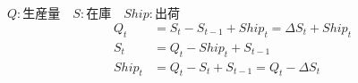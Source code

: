 \documentclass[a4paper,12pt]{jsarticle}
\title{}
\author{}
\date{}
\theoremstyle{definition}
\begin{document}
\maketitle{}


\(Q:生産量\quad S:在庫\quad Ship:出荷\)
\begin{align*}
Q_t&=S_t- S_{t-1}+Ship_t=\Delta S_t+Ship_t\\
S_t&=Q_t-Ship_t+S_{t-1}\\
Ship_t&=Q_t-S_t+S_{t-1}=Q_t-\Delta S_t
\end{align*}
\end{document}

